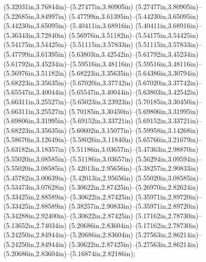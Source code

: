 (5.32031in,3.76844in)--(5.27477in,3.80905in) (5.27477in,3.80905in)--(5.22685in,3.84997in) (5.47799in,3.61395in)--(5.44230in,3.65095in) (5.44230in,3.65095in)--(5.40411in,3.68916in) (5.40411in,3.68916in)--(5.36343in,3.72840in) (5.56976in,3.51182in)--(5.54175in,3.54425in) (5.54175in,3.54425in)--(5.51115in,3.57833in) (5.51115in,3.57833in)--(5.47799in,3.61395in) (5.63803in,3.42542in)--(5.61792in,3.45234in) (5.61792in,3.45234in)--(5.59516in,3.48116in) (5.59516in,3.48116in)--(5.56976in,3.51182in) (5.68223in,3.35635in)--(5.64386in,3.30794in) (5.68223in,3.35635in)--(5.67020in,3.37742in) (5.67020in,3.37742in)--(5.65547in,3.40044in) (5.65547in,3.40044in)--(5.63803in,3.42542in) (5.66311in,3.25527in)--(5.65023in,3.23923in) (5.70185in,3.30450in)--(5.66311in,3.25527in) (5.70185in,3.30450in)--(5.69806in,3.31995in) (5.69806in,3.31995in)--(5.69152in,3.33721in) (5.69152in,3.33721in)--(5.68223in,3.35635in) (5.60602in,3.15077in)--(5.59958in,3.14268in) (5.58670in,3.12649in)--(5.58026in,3.11840in) (5.65766in,3.21679in)--(5.63182in,3.18357in) (5.51186in,3.03657in)--(5.47363in,2.98870in) (5.55020in,3.08585in)--(5.51186in,3.03657in) (5.56294in,3.09594in)--(5.55020in,3.08585in) (5.42013in,2.95656in)--(5.38257in,2.90833in) (5.45782in,3.00639in)--(5.42013in,2.95656in) (5.55020in,3.08585in)--(5.53473in,3.07628in) (5.30622in,2.87425in)--(5.26970in,2.82624in) (5.33425in,2.88589in)--(5.30622in,2.87425in) (5.35971in,2.89720in)--(5.33425in,2.88589in) (5.38257in,2.90833in)--(5.35971in,2.89720in) (5.34288in,2.92400in)--(5.30622in,2.87425in) (5.17162in,2.78730in)--(5.13652in,2.74034in) (5.20686in,2.83604in)--(5.17162in,2.78730in) (5.24250in,2.84944in)--(5.20686in,2.83604in) (5.27563in,2.86214in)--(5.24250in,2.84944in) (5.30622in,2.87425in)--(5.27563in,2.86214in) (5.20686in,2.83604in)--(5.16874in,2.82186in);
